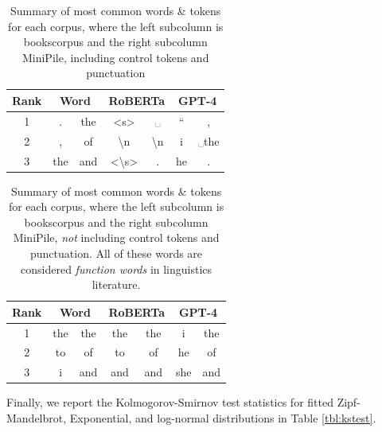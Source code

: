 \documentclass[11pt]{article}
\begin{document}
\begin{table}
    \centering
    \begin{tabular}{|c|c|c|c|c|c|c|}
        \hline
        \textbf{Rank} & \multicolumn{2}{c|}{\textbf{Word}} & \multicolumn{2}{c|}{\textbf{RoBERTa}} & \multicolumn{2}{c|}{\textbf{GPT-4}}  \\
        \hline
        1 & . & the & <s> & ␣ & `` & , \\
        \hline
        2 & , & of & \textbackslash n & \textbackslash n & i & ␣the \\
        \hline
        3 & the & and & <\textbackslash s> & . & he & . \\
        \hline
    \end{tabular}
    \caption{Summary of most common words \& tokens for each corpus, where the left subcolumn is bookscorpus and the right subcolumn MiniPile, including control tokens and punctuation}
    \label{tbl:token ranks}
\end{table}

\begin{table}
    \centering
    \begin{tabular}{|c|c|c|c|c|c|c|}
        \hline
        \textbf{Rank} & \multicolumn{2}{c|}{\textbf{Word}} & \multicolumn{2}{c|}{\textbf{RoBERTa}} & \multicolumn{2}{c|}{\textbf{GPT-4}}  \\
        \hline
        1 & the & the & the & the & i & the \\
        \hline
        2 & to & of & to & of & he & of \\
        \hline
        3 & i & and & and & and & she & and \\
        \hline
    \end{tabular}
    \caption{Summary of most common words \& tokens for each corpus, where the left subcolumn is bookscorpus and the right subcolumn MiniPile, \textit{not} including control tokens and punctuation. All of these words are considered \textit{function words} in linguistics literature.}
    \label{tbl:token ranks no control}
\end{table}

Finally, we report the Kolmogorov-Smirnov test statistics for fitted Zipf-Mandelbrot, Exponential, and log-normal distributions in Table \ref{tbl:kstest}. 
\end{document}
